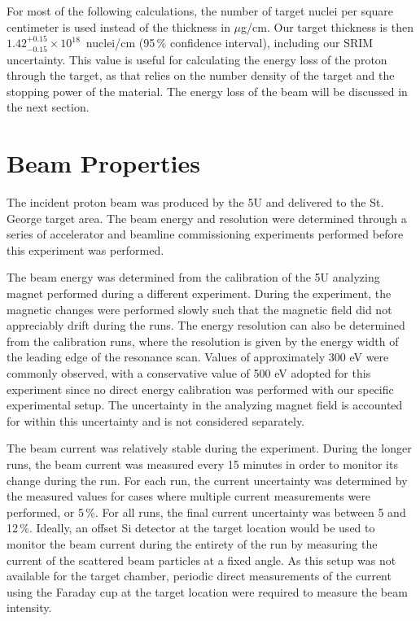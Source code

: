 For most of the following calculations, the number of target nuclei per
square centimeter is used instead of the thickness in
$\mu$g/cm\squared{}. Our target thickness is then $1.42^{+0.15}_{-0.15}
\times 10^{18}$~nuclei/cm\squared{} (95\,\% confidence interval),
including our SRIM uncertainty. This value is useful for calculating the
energy loss of the proton through the target, as that relies on the
number density of the target and the stopping power of the material. The
energy loss of the beam will be discussed in the next section.


\section{Beam Properties}
\label{sec:beam-properties}

The incident proton beam was produced by the 5U and delivered to the St.
George target area. The beam energy and resolution were determined
through a series of accelerator and beamline commissioning experiments
performed before this experiment was performed.


The beam energy was determined from the calibration of the 5U analyzing
magnet performed during a different experiment. During the experiment,
the magnetic changes were performed slowly such that the magnetic field
did not appreciably drift during the runs. The energy resolution can
also be determined from the calibration runs, where the resolution is
given by the energy width of the leading edge of the resonance scan.
Values of approximately 300 eV were commonly observed, with a
conservative value of 500 eV adopted for this experiment since no direct
energy calibration was performed with our specific experimental setup.
The uncertainty in the analyzing magnet field is accounted for within
this uncertainty and is not considered separately.


The beam current was relatively stable during the experiment. During the
longer runs, the beam current was measured every 15 minutes in order to
monitor its change during the run. For each run, the current uncertainty
was determined by the measured values for cases where multiple current
measurements were performed, or 5\,\%. For all runs, the final current
uncertainty was between 5 and 12\,\%. Ideally, an offset Si detector at
the target location would be used to monitor the beam current during the
entirety of the run by measuring the current of the scattered beam
particles at a fixed angle. As this setup was not available for the
target chamber, periodic direct measurements of the current using the
Faraday cup at the target location were required to measure the beam
intensity.

